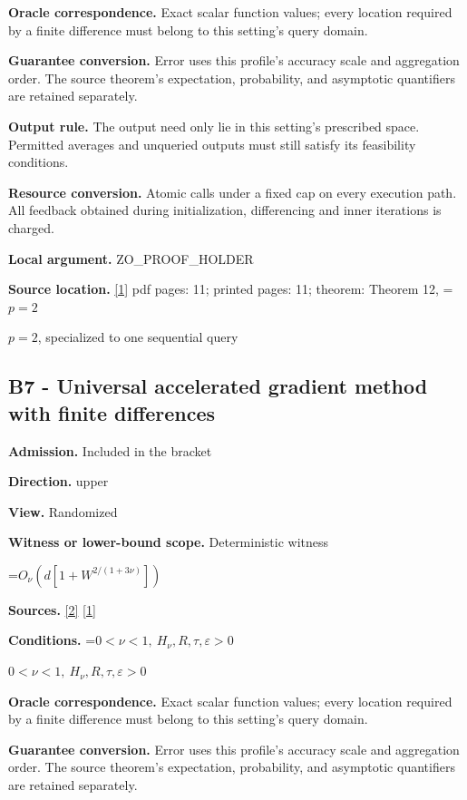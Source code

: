 \documentclass[10pt,a4paper]{article}
\newcommand{\AtlasMath}[1]{\par\begingroup\centering\setbox0=\hbox{$\displaystyle #1$}\ifdim\wd0>1.4\linewidth\typeout{ATLAS WIDE FORMULA: \the\wd0}\fi\ifdim\wd0>\linewidth\resizebox{\linewidth}{!}{\box0}\else\box0\fi\par\endgroup}
\newcommand{\AtlasInlineMath}[1]{\begingroup\setbox0=\hbox{$#1$}\ifdim\wd0>.4\linewidth\endgroup\AtlasMath{#1}\else\endgroup$#1$\fi}
\begin{document}
\textbf{Oracle correspondence.} Exact scalar function values; every location required by a finite difference must belong to this setting's query domain.

\textbf{Guarantee conversion.} Error uses this profile's accuracy scale and aggregation order. The source theorem's expectation, probability, and asymptotic quantifiers are retained separately.

\textbf{Output rule.} The output need only lie in this setting's prescribed space. Permitted averages and unqueried outputs must still satisfy its feasibility conditions.

\textbf{Resource conversion.} Atomic calls under a fixed cap on every execution path. All feedback obtained during initialization, differencing and inner iterations is charged.

\textbf{Local argument.} ZO\_\allowbreak{}PROOF\_\allowbreak{}HOLDER

\textbf{Source location.} \href{https://proceedings.mlr.press/v99/diakonikolas19c/diakonikolas19c.pdf}{[1]} pdf pages: 11; printed pages: 11; theorem: Theorem 12, \AtlasInlineMath{p=2}, specialized to one sequential query

\subsection{B7 - Universal accelerated gradient method with finite differences}
\textbf{Admission.} Included in the bracket

\textbf{Direction.} upper

\textbf{View.} Randomized

\textbf{Witness or lower-bound scope.} Deterministic witness

\AtlasMath{O_\nu(d[1+W^{2/(1+3\nu)}])}
\textbf{Sources.} \href{https://optimization-online.org/wp-content/uploads/2013/04/3833.pdf}{[2]} \href{https://proceedings.mlr.press/v99/diakonikolas19c/diakonikolas19c.pdf}{[1]}

\textbf{Conditions.} \AtlasInlineMath{0<\nu<1,\ H_\nu,R,\tau,\varepsilon>0}

\textbf{Oracle correspondence.} Exact scalar function values; every location required by a finite difference must belong to this setting's query domain.

\textbf{Guarantee conversion.} Error uses this profile's accuracy scale and aggregation order. The source theorem's expectation, probability, and asymptotic quantifiers are retained separately.
\end{document}
